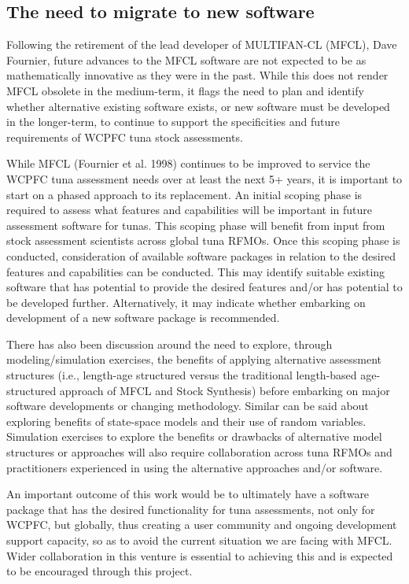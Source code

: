 \documentclass{SCreport}
\begin{document}
\subsection{The need to migrate to new software}

Following the retirement of the lead developer of MULTIFAN-CL (MFCL), Dave
Fournier, future advances to the MFCL software are not expected to be as
mathematically innovative as they were in the past. While this does not render
MFCL obsolete in the medium-term, it flags the need to plan and identify whether
alternative existing software exists, or new software must be developed in the
longer-term, to continue to support the specificities and future requirements of
WCPFC tuna stock assessments.

While MFCL (Fournier et al. 1998) continues to be improved to service the WCPFC
tuna assessment needs over at least the next 5+ years, it is important to start
on a phased approach to its replacement. An initial scoping phase is required to
assess what features and capabilities will be important in future assessment
software for tunas. This scoping phase will benefit from input from stock
assessment scientists across global tuna RFMOs. Once this scoping phase is
conducted, consideration of available software packages in relation to the
desired features and capabilities can be conducted. This may identify suitable
existing software that has potential to provide the desired features and/or has
potential to be developed further. Alternatively, it may indicate whether
embarking on development of a new software package is recommended.

There has also been discussion around the need to explore, through
modeling/simulation exercises, the benefits of applying alternative assessment
structures (i.e., length-age structured versus the traditional length-based
age-structured approach of MFCL and Stock Synthesis) before embarking on major
software developments or changing methodology. Similar can be said about
exploring benefits of state-space models and their use of random variables.
Simulation exercises to explore the benefits or drawbacks of alternative model
structures or approaches will also require collaboration across tuna RFMOs and
practitioners experienced in using the alternative approaches and/or software.

An important outcome of this work would be to ultimately have a software package
that has the desired functionality for tuna assessments, not only for WCPFC, but
globally, thus creating a user community and ongoing development support
capacity, so as to avoid the current situation we are facing with MFCL. Wider
collaboration in this venture is essential to achieving this and is expected to
be encouraged through this project.
\end{document}
